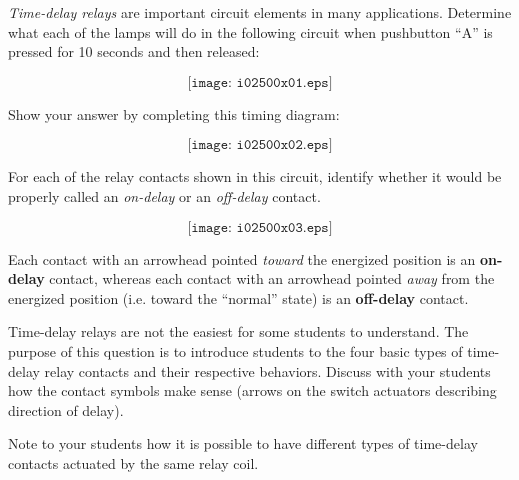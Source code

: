 

{\it Time-delay relays} are important circuit elements in many applications.  Determine what each of the lamps will do in the following circuit when pushbutton ``A'' is pressed for 10 seconds and then released:

$$\texttt{[image: i02500x01.eps]}$$

Show your answer by completing this timing diagram:

$$\texttt{[image: i02500x02.eps]}$$

For each of the relay contacts shown in this circuit, identify whether it would be properly called an {\it on-delay} or an {\it off-delay} contact.







$$\texttt{[image: i02500x03.eps]}$$

Each contact with an arrowhead pointed {\it toward} the energized position is an {\bf on-delay} contact, whereas each contact with an arrowhead pointed {\it away} from the energized position (i.e. toward the ``normal'' state) is an {\bf off-delay} contact.

\vskip 10pt

Time-delay relays are not the easiest for some students to understand.  The purpose of this question is to introduce students to the four basic types of time-delay relay contacts and their respective behaviors.  Discuss with your students how the contact symbols make sense (arrows on the switch actuators describing direction of delay).

Note to your students how it is possible to have different types of time-delay contacts actuated by the same relay coil.











